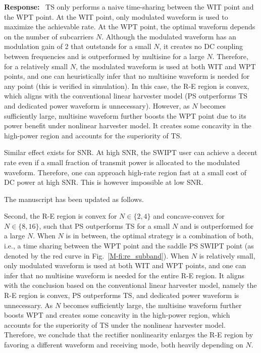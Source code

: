 \documentclass{article}
\newcounter{reviewer}
\newcounter{point}[reviewer]
\newcounter{response}[reviewer]
\newenvironment{response}
	{\refstepcounter{response} \medskip \noindent \textbf{Response:}\ }
	{\medskip}
\begin{document}
\begin{reviewer}
\begin{response}
			TS only performs a naive time-sharing between the WIT point and the WPT point. At the WIT point, only modulated waveform is used to maximize the achievable rate. At the WPT point, the optimal waveform depends on the number of subcarriers $N$. Although the modulated waveform has an modulation gain of \num{2} that outstands for a small $N$, it creates no DC coupling between frequencies and is outperformed by multisine for a large $N$. Therefore, for a relatively small $N$, the modulated waveform is used at both WIT and WPT points, and one can heuristically infer that no multisine waveform is needed for any point (this is verified in simulation). In this case, the R-E region is convex, which aligns with the conventional linear harvester model (PS outperforms TS and dedicated power waveform is unnecessary). However, as $N$ becomes sufficiently large, multisine waveform further boosts the WPT point due to its power benefit under nonlinear harvester model. It creates some concavity in the high-power region and accounts for the superiority of TS.

			Similar effect exists for SNR. At high SNR, the SWIPT user can achieve a decent rate even if a small fraction of transmit power is allocated to the modulated waveform. Therefore, one can approach high-rate region fast at a small cost of DC power at high SNR. This is however impossible at low SNR.

			The manuscript has been updated as follows.
			\begin{framed}
				Second, the R-E region is convex for $N \in \{2,4\}$ and concave-convex for $N \in \{8,16\}$, such that PS outperforms TS for a small $N$ and is outperformed for a large $N$. When $N$ is in between, the optimal strategy is a combination of both, i.e., a time sharing between the WPT point and the saddle PS SWIPT point (as denoted by the red curve in Fig.~\ref{M-fi:re_subband}). When $N$ is relatively small, only modulated waveform is used at both WIT and WPT points, and one can infer that no multisine waveform is needed for the entire R-E region. It aligns with the conclusion based on the conventional linear harvester model, namely the R-E region is convex, PS outperforms TS, and dedicated power waveform is unnecessary. As $N$ becomes sufficiently large, the multisine waveform further boosts WPT and creates some concavity in the high-power region, which accounts for the superiority of TS under the nonlinear harvester model. Therefore, we conclude that the rectifier nonlinearity enlarges the R-E region by favoring a different waveform and receiving mode, both heavily depending on $N$.
			\end{framed}
		\end{response}


\end{reviewer}
\end{document}
